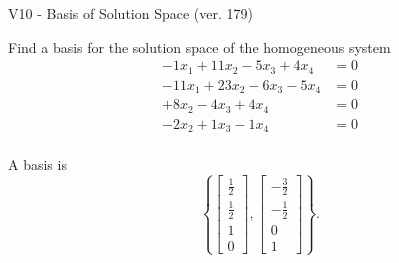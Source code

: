 \begin{exercise}
  \begin{exerciseTitle}V10 - Basis of Solution Space (ver. 179)\end{exerciseTitle}
  \begin{exerciseStatement}
    Find a basis for the solution space of the homogeneous system 
\begin{align*}
 -1 x_ 1 + 11 x_ 2 -5 x_ 3 + 4 x_ 4 &= 0  \\ 
  -11 x_ 1 + 23 x_ 2 -6 x_ 3 -5 x_ 4 &= 0  \\ 
  + 8 x_ 2 -4 x_ 3 + 4 x_ 4 &= 0  \\ 
  -2 x_ 2 + 1 x_ 3 -1 x_ 4 &= 0  \\ 
 \end{align*}


 
  \end{exerciseStatement}

  \begin{exerciseAnswer}
   A basis is   
\[\left\{\left[\begin{array}{c}
\frac{1}{2} \\
\frac{1}{2} \\
1 \\
0
\end{array}\right] , \left[\begin{array}{c}
-\frac{3}{2} \\
-\frac{1}{2} \\
0 \\
1
\end{array}\right]\right\}.\]

  


  \end{exerciseAnswer}
\end{exercise}